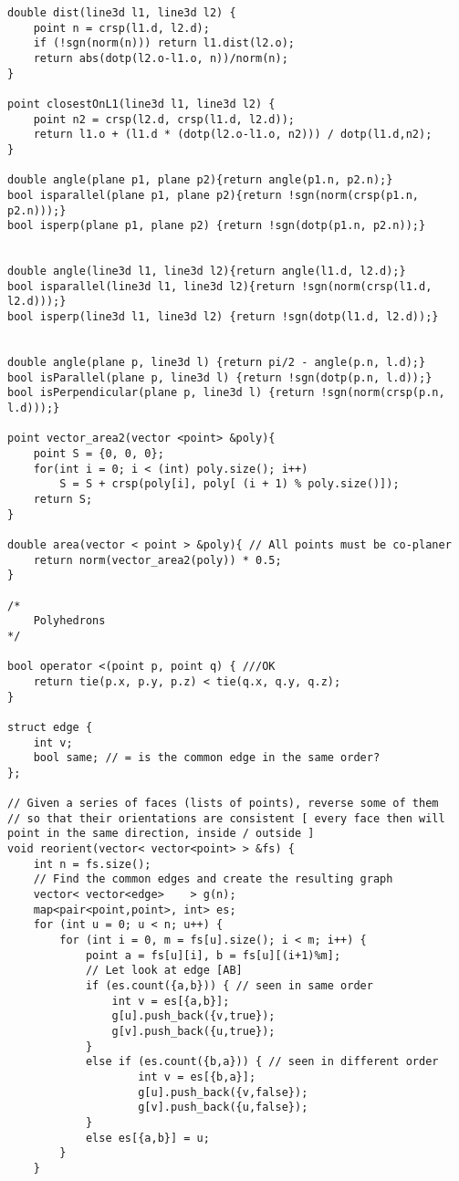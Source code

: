 \documentclass[10pt,a4paper,onesided]{article}
\begin{document}
\begin{multicols*}{3}
\begin{lstlisting}
double dist(line3d l1, line3d l2) {
    point n = crsp(l1.d, l2.d);
    if (!sgn(norm(n))) return l1.dist(l2.o);
    return abs(dotp(l2.o-l1.o, n))/norm(n);
}

point closestOnL1(line3d l1, line3d l2) {
    point n2 = crsp(l2.d, crsp(l1.d, l2.d));
    return l1.o + (l1.d * (dotp(l2.o-l1.o, n2))) / dotp(l1.d,n2);
}

double angle(plane p1, plane p2){return angle(p1.n, p2.n);}
bool isparallel(plane p1, plane p2){return !sgn(norm(crsp(p1.n, p2.n)));}
bool isperp(plane p1, plane p2) {return !sgn(dotp(p1.n, p2.n));}


double angle(line3d l1, line3d l2){return angle(l1.d, l2.d);}
bool isparallel(line3d l1, line3d l2){return !sgn(norm(crsp(l1.d, l2.d)));}
bool isperp(line3d l1, line3d l2) {return !sgn(dotp(l1.d, l2.d));}


double angle(plane p, line3d l) {return pi/2 - angle(p.n, l.d);}
bool isParallel(plane p, line3d l) {return !sgn(dotp(p.n, l.d));}
bool isPerpendicular(plane p, line3d l) {return !sgn(norm(crsp(p.n, l.d)));}

point vector_area2(vector <point> &poly){
    point S = {0, 0, 0};
    for(int i = 0; i < (int) poly.size(); i++)
        S = S + crsp(poly[i], poly[ (i + 1) % poly.size()]);
    return S;
}

double area(vector < point > &poly){ // All points must be co-planer
    return norm(vector_area2(poly)) * 0.5;
}

/*
    Polyhedrons
*/

bool operator <(point p, point q) { ///OK
    return tie(p.x, p.y, p.z) < tie(q.x, q.y, q.z);
}

struct edge {
    int v;
    bool same; // = is the common edge in the same order?
};

// Given a series of faces (lists of points), reverse some of them
// so that their orientations are consistent [ every face then will point in the same direction, inside / outside ]
void reorient(vector< vector<point> > &fs) {
    int n = fs.size();
    // Find the common edges and create the resulting graph
    vector< vector<edge>    > g(n);
    map<pair<point,point>, int> es;
    for (int u = 0; u < n; u++) {
        for (int i = 0, m = fs[u].size(); i < m; i++) {
            point a = fs[u][i], b = fs[u][(i+1)%m];
            // Let look at edge [AB]
            if (es.count({a,b})) { // seen in same order
                int v = es[{a,b}];
                g[u].push_back({v,true});
                g[v].push_back({u,true});
            }
            else if (es.count({b,a})) { // seen in different order
                    int v = es[{b,a}];
                    g[u].push_back({v,false});
                    g[v].push_back({u,false});
            }
            else es[{a,b}] = u;
        }
    }


\end{lstlisting}
\end{multicols*}
\end{document}
